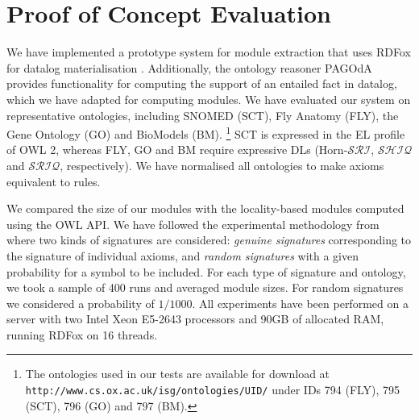 
\section{Proof of Concept Evaluation}

We have implemented a prototype system for module extraction that
uses RDFox for datalog materialisation \cite{DBLP:conf/aaai/MotikNPHO14}. 
Additionally, the ontology reasoner PAGOdA \cite{DBLP:conf/aaai/ZhouNGH14} 
provides functionality for computing the support of an entailed
fact in datalog, which we have adapted for computing modules.
We have evaluated our system on representative ontologies, including
SNOMED (SCT), Fly Anatomy (FLY), the Gene Ontology (GO) and BioModels (BM).%
\footnote{The ontologies used in our tests are available for download at 
\texttt{http://www.cs.ox.ac.uk/isg/ontologies/UID/} under IDs 794 (FLY), 795 (SCT),
796 (GO) and 797 (BM).} %
SCT is expressed in the EL profile of OWL 2, whereas
FLY, GO and BM require expressive DLs (Horn-$\mathcal{SRI}$, $\mathcal{SHIQ}$ and
$\mathcal{SRIQ}$, respectively). 
We have normalised all ontologies 
to make axioms equivalent to rules.

We compared the size of our modules with the locality-based modules 
computed using the OWL API.
We have followed the experimental 
methodology from~\cite{VescovoKPS0T13} where two kinds of %
signatures are considered: \emph{genuine signatures} corresponding to
the signature of individual axioms, and 
\emph{random signatures} with a given probability for a symbol to be
included.
For each type of signature and ontology, we took a sample of
400 runs and
averaged module sizes. For random signatures we 
considered a probability of $1/1000$.
All experiments have been performed on a 
server with two Intel Xeon E5-2643 processors and 90GB of allocated RAM,
running RDFox on 16 threads. 





